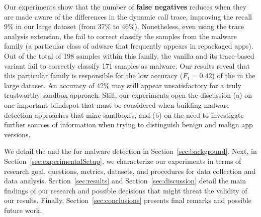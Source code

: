 Our experiments show that the number of {\bf false negatives} reduces when they are made aware of the
differences in the dynamic call trace, improving the recall 9\% in our large dataset (from 37\% to 46\%). 
Nonetheless, even using the trace analysis extension, the \mas fail to correct classify the samples
from the \gps malware family (a particular class of adware that frequently appears in repackaged apps).
Out of the total of 198 samples within this family, the vanilla \mas and its trace-based variant
fail to correctly classify 171 samples as malware. Our results reveal that this particular family is
responsible for the low accuracy ($F_1 = 0.42$) of the \mas in the large dataset. 
An accuracy of 42\% may still appear unsatisfactory for a truly trustworthy sandbox approach. Still, 
our experiments open the discussion (a) on one important blindspot that must be considered when building 
malware detection approaches that mine sandboxes, and (b) on the need to investigate further sources of
information when trying to distinguish benign and malign app versions.

We detail the \mas and the \mas for malware detection in
Section~\ref{sec:background}. Next, in Section~\ref{sec:experimentalSetup}, we
characterize our experiments in terms of research goal, questions, metrics, datasets, 
and procedures for data collection and data analysis. Section~\ref{sec:results} and
Section~\ref{sec:discussion} detail the main findings of our research and
possible decisions that might threat the validity of our results. Finally,
Section~\ref{sec:conclusions} presents final remarks and possible future
work.
